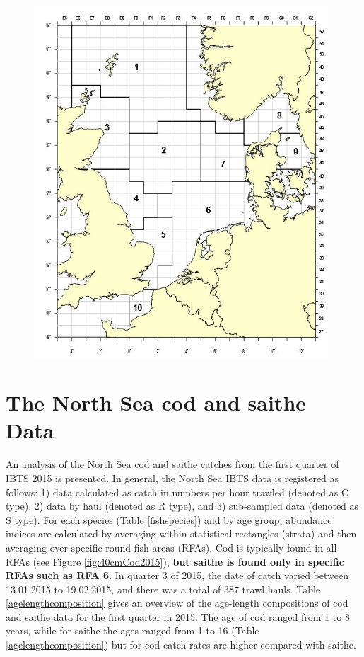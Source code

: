 \documentclass[a4paper 12pt]{article}
\numberwithin{equation}{section}
\begin{document}
\begin{figure}[h!]
  \centering
 {\includegraphics[width=11cm]{icesroundfishmap.jpg}}   
\end{figure}

\section{The North Sea cod and saithe Data}
\label{sec:data}
An analysis of the North Sea cod and saithe catches from the first quarter of IBTS 2015  is presented. In general, the North Sea IBTS data is registered as follows: 1) data calculated as catch in  numbers per hour trawled (denoted as C type), 2) data by haul (denoted as R type), and 3) sub-sampled data (denoted as S type). For each  species (Table \ref{fishspecies}) and by age group, abundance indices are calculated by averaging within statistical rectangles (strata) and then averaging over specific round fish areas (RFAs). Cod is typically found in all RFAs  (see Figure \ref{fig:40cmCod2015}), {\bf but saithe is found only in specific RFAs such as RFA 6}. In quarter 3 of 2015, the date of catch varied between 13.01.2015 to 19.02.2015, and there was a total of 387 trawl hauls. Table \ref{agelengthcomposition} gives an overview of the age-length compositions of cod and saithe data for the first quarter in 2015.  The age of cod ranged from 1 to 8 years, while for saithe the ages ranged from 1 to 16 (Table \ref{agelengthcomposition}) but for cod catch rates are higher compared with saithe.  \\
\end{document}
